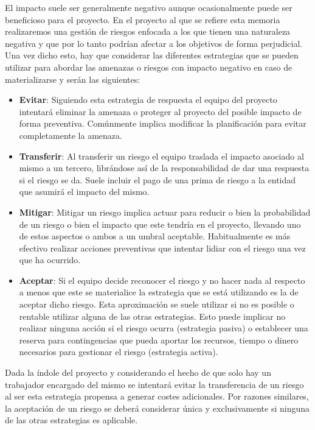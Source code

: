 \bigskip

El impacto suele ser generalmente negativo aunque ocasionalmente puede ser beneficioso para el proyecto. En el proyecto al que se refiere esta memoria realizaremos una gestión de riesgos enfocada a los que tienen una naturaleza negativa y que por lo tanto podrían afectar a los objetivos de forma perjudicial. Una vez dicho esto, hay que considerar las diferentes estrategias que se pueden utilizar para abordar las amenazas o riesgos con impacto negativo en caso de materializarse y serán las siguientes:

\begin{itemize}
	
	\item \textbf{Evitar}: Siguiendo esta estrategia de respuesta el equipo del proyecto intentará eliminar la amenaza o proteger al proyecto del posible impacto de forma preventiva. Comúnmente implica modificar la planificación para evitar completamente la amenaza. 
	
	\item \textbf{Transferir}: Al transferir un riesgo el equipo traslada el impacto asociado al mismo a un tercero, librándose así de la responsabilidad de dar una respuesta si el riesgo se da. Suele incluir el pago de una prima de riesgo a la entidad que asumirá el impacto del mismo. 
	
	\item \textbf{Mitigar}: Mitigar un riesgo implica actuar para reducir o bien la probabilidad de un riesgo o bien el impacto que este tendría en el proyecto, llevando uno de estos aspectos o ambos a un umbral aceptable. Habitualmente es más efectivo realizar acciones preventivas que intentar lidiar con el riesgo una vez que ha ocurrido. 
	
	\item \textbf{Aceptar}: Si el equipo decide reconocer el riesgo y no hacer nada al respecto a menos que este se materialice la estrategia que se está utilizando es la de aceptar dicho riesgo. Esta aproximación se suele utilizar si no es posible o rentable utilizar alguna de las otras estrategias. Esto puede implicar no realizar ninguna acción si el riesgo ocurra (estrategia pasiva) o establecer una reserva para contingencias que pueda aportar los recursos, tiempo o dinero necesarios para gestionar el riesgo (estrategia activa).
	
\end{itemize}

Dada la índole del proyecto y considerando el hecho de que solo hay un trabajador encargado del mismo se intentará evitar la transferencia de un riesgo al ser esta estrategia propensa a generar costes adicionales. Por razones similares, la aceptación de un riesgo se deberá considerar única y exclusivamente si ninguna de las otras estrategias es aplicable.

